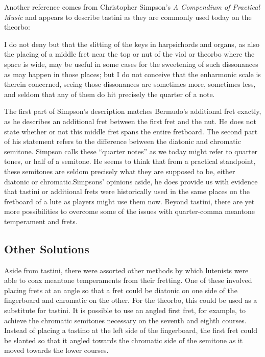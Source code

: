 Another reference comes from Christopher Simpson's \textit{A Compendium of Practical
Music} and appears to describe tastini as they are commonly used today on the theorbo:
\begin{blocks}
I do not deny but that the slitting of the keys in harpsichords and organs, as also the
placing of a middle fret near the top or nut of the viol or theorbo where the space is
wide, may be useful in some cases for the sweetening of such dissonances as may happen
in those places; but I do not conceive that the enharmonic scale is therein concerned,
seeing those dissonances are sometimes more, sometimes less, and seldom that any of them
do hit precisely the quarter of a note. \autocite[51]{CS:1}
\end{blocks}
The first part of Simpson's description matches Bermudo's additional fret exactly, as
he describes an additional fret between the first fret and the nut.  He does not state
whether or not this middle fret spans the entire fretboard.  The second part of
his statement refers to the difference between the diatonic and chromatic semitone.
Simpson calls these ``quarter notes'' as we today might refer to quarter tones, or
half of a semitone.  He seems to think that from a practical standpoint, these
semitones are seldom precisely what they are supposed to be, either diatonic or
chromatic.Simpsons' opinions aside, he does provide us with evidence that tastini or
additional frets were historically used in the same places on the fretboard of a lute
as players might use them now.  Beyond tastini, there are yet more possibilities to
overcome some of the issues with quarter-comma meantone temperament and frets.

\subsection{Other Solutions}

Aside from tastini, there were assorted other methods by which lutenists were able to
coax meantone temperaments from their fretting.  One of these involved placing frets at
an angle so that a fret could be diatonic on one side of the fingerboard and chromatic on
the other.  For the theorbo, this could be used as a substitute for tastini.  It
is possible to use an angled first fret, for example, to achieve the chromatic
semitones necessary on the seventh and eighth courses.  Instead of placing a tastino at
the left side of the fingerboard, the first fret could be slanted so that it
angled towards the chromatic side of the semitone as it moved towards the
lower courses.

